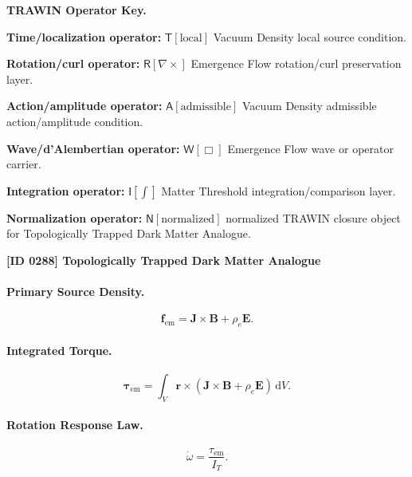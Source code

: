 \par\vspace{0.45\baselineskip}
\noindent\begin{minipage}[t]{\linewidth}
\begingroup
\small
\raggedright
\textbf{TRAWIN Operator Key.}\par
\noindent\textbf{Time/localization operator:} $\mathsf{T}\!\left[\mathrm{local}\right]$ Vacuum Density local source condition.\par
\noindent\textbf{Rotation/curl operator:} $\mathsf{R}\!\left[\nabla\times\right]$ Emergence Flow rotation/curl preservation layer.\par
\noindent\textbf{Action/amplitude operator:} $\mathsf{A}\!\left[\mathrm{admissible}\right]$ Vacuum Density admissible action/amplitude condition.\par
\noindent\textbf{Wave/d'Alembertian operator:} $\mathsf{W}\!\left[\Box\right]$ Emergence Flow wave or operator carrier.\par
\noindent\textbf{Integration operator:} $\mathsf{I}\!\left[\int\right]$ Matter Threshold integration/comparison layer.\par
\noindent\textbf{Normalization operator:} $\mathsf{N}\!\left[\mathrm{normalized}\right]$ normalized TRAWIN closure object for Topologically Trapped Dark Matter Analogue.\par
\endgroup
\end{minipage}

\clearpage
\noindent\textbf{[ID 0288] Topologically Trapped Dark Matter Analogue}\par
\vspace{0.35em}
\paragraph{Primary Source Density.}
\begin{equation}
\mathbf{f}_{\mathrm{em}}
=
\mathbf{J}\times\mathbf{B}
+
\rho_e\mathbf{E}.
\end{equation}

\paragraph{Integrated Torque.}
\begin{equation}
\boldsymbol{\tau}_{\mathrm{em}}
=
\int_V
\mathbf{r}\times
\left(
\mathbf{J}\times\mathbf{B}
+
\rho_e\mathbf{E}
\right)
\,\mathrm{d}V .
\end{equation}

\paragraph{Rotation Response Law.}
\begin{equation}
\dot{\omega}
=
\frac{\tau_{\mathrm{em}}}{I_T}.
\end{equation}

